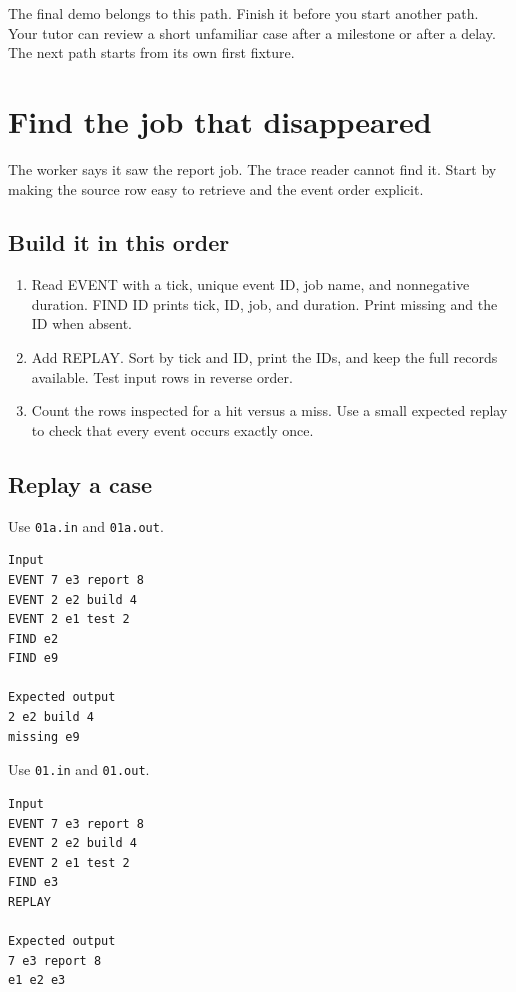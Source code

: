 \documentclass[11pt,letterpaper]{article}
\begin{document}
The final demo belongs to this path. Finish it before you start another path. Your tutor can review a short unfamiliar case after a milestone or after a delay. The next path starts from its own first fixture.

\clearpage

\section{Find the job that disappeared}\label{datacenter:01}

The worker says it saw the report job. The trace reader cannot find it. Start by making the source row easy to retrieve and the event order explicit.

\subsection*{Build it in this order}

\begin{enumerate}
\item Read EVENT with a tick, unique event ID, job name, and nonnegative duration. FIND ID prints tick, ID, job, and duration. Print missing and the ID when absent.
\item Add REPLAY. Sort by tick and ID, print the IDs, and keep the full records available. Test input rows in reverse order.
\item Count the rows inspected for a hit versus a miss. Use a small expected replay to check that every event occurs exactly once.
\end{enumerate}

\subsection*{Replay a case}

Use \texttt{01a.in} and \texttt{01a.out}.

\begin{samepage}
\small
\begin{verbatim}
Input
EVENT 7 e3 report 8
EVENT 2 e2 build 4
EVENT 2 e1 test 2
FIND e2
FIND e9

Expected output
2 e2 build 4
missing e9
\end{verbatim}
\end{samepage}

Use \texttt{01.in} and \texttt{01.out}.

\begin{samepage}
\small
\begin{verbatim}
Input
EVENT 7 e3 report 8
EVENT 2 e2 build 4
EVENT 2 e1 test 2
FIND e3
REPLAY

Expected output
7 e3 report 8
e1 e2 e3
\end{verbatim}
\end{samepage}
\end{document}
